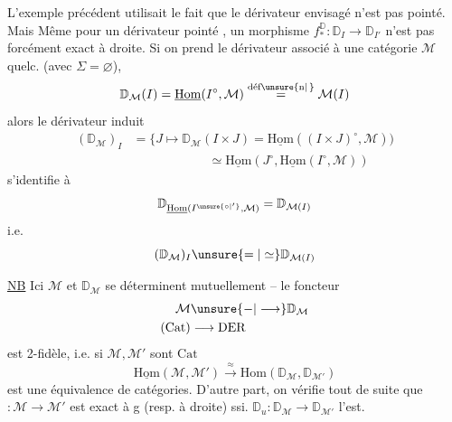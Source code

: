 L'exemple précédent utilisait le fait que le dérivateur envisagé n'est pas pointé. Mais Même pour un dérivateur pointé , un morphisme $f^{\mathbb D}_*:\mathbb D_I\longrightarrow\mathbb D_{I'}$ n'est pas forcément exact à droite. Si on prend le dérivateur associé à une catégorie $\mathcal M$ quelc. (avec $\Sigma=\varnothing$),
\[
\mathbb D_{\mathcal M}(I)=\underline{\mathrm{Hom}}(I^\circ,\mathcal M)\overset{\text{déf}\unsure{\text{n}|\,}}{=}\mathcal M(I)
\]
alors le dérivateur induit
\[
\begin{aligned}
(\mathbb D_{\mathcal M})_I&=\big\{J\longmapsto\mathbb D_{\mathcal M}(I\times J)=\underline{\mathrm{Hom}}((I\times J)^\circ,\mathcal M))\\
&\hspace{6em}\simeq\underline{\mathrm{Hom}}(J^\circ,\underline{\mathrm{Hom}}(I^\circ,\mathcal M))
\end{aligned}
\]
s'identifie à
\[
\mathbb D_{\underline{\mathrm{Hom}}(I^{\unsure{\circ|'}},\mathcal M)}=\mathbb D_{\mathcal M(I)}
\]
i.e.
\[
(\mathbb D_{\mathcal M})_I\unsure{=|\simeq}\mathbb D_{\mathcal M(I)}
\]


\uline{NB} Ici $\mathcal M$ et $\mathbb D_{\mathcal M}$ se déterminent mutuellement -- le foncteur
\[
\begin{aligned}
\mathcal M&\unsure{\mathord{-}|\longrightarrow}\mathbb D_{\mathcal M}\\
(\mathrm{Cat})&\longrightarrow\mathrm{DER}
\end{aligned}
\]
est 2-fidèle, i.e. si $\mathcal M,\mathcal M'$ sont  $\mathrm{Cat}$
\[
\underline{\mathrm{Hom}}(\mathcal M,\mathcal M')\xrightarrow{\approx}\mathrm{Hom}(\mathbb D_{\mathcal M},\mathbb D_{\mathcal M'})
\]
est une équivalence de catégories. D'autre part, on vérifie tout de suite que   $:\mathcal M\longrightarrow\mathcal M'$ est exact à g (resp. à droite) ssi. $\mathbb D_u:\mathbb D_{\mathcal M}\longrightarrow\mathbb D_{\mathcal M'}$ l'est.

